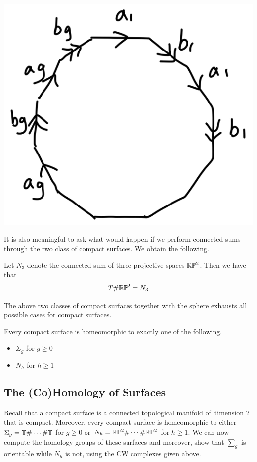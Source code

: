 \documentclass[a4paper]{article}
\begin{document}
\begin{center}
\includegraphics[scale = 0.3]{Image 3}
\end{center}

It is also meaningful to ask what would happen if we perform connected sums through the two class of compact surfaces. We obtain the following. 

\begin{prp}{}{} Let $N_3$ denote the connected sum of three projective spaces $\mathbb{R}\mathbb{P}^2$. Then we have that $$T\#\mathbb{R}\mathbb{P}^2=N_3$$ 
\end{prp}

The above two classes of compact surfaces together with the sphere exhausts all possible cases for compact surfaces. 

\begin{thm}{}{} Every compact surface is homeomorphic to exactly one of the following. 
\begin{itemize}
\item $\Sigma_g$ for $g\geq 0$
\item $N_h$ for $h\geq 1$
\end{itemize}
\end{thm}

\subsection{The (Co)Homology of Surfaces}
Recall that a compact surface is a connected topological manifold of dimension $2$ that is compact. Moreover, every compact surface is homeomorphic to either $\Sigma_g=\mathbb{T}\#\cdots\#\mathbb{T}$ for $g\geq 0$ or $N_h=\mathbb{R}\mathbb{P}^2\#\cdots\#\mathbb{R}\mathbb{P}^2$ for $h\geq 1$. We can now compute the homology groups of these surfaces and moreover, show that $\sum_g$ is orientable while $N_h$ is not, using the CW complexes given above. 
\end{document}
